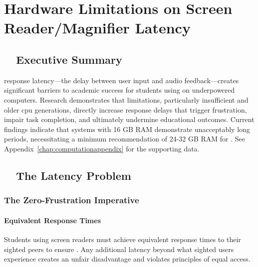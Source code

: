 \chapter{Hardware Limitations on Screen Reader/Magnifier Latency}\label{vision-assistive-technology-laptop-computer-requirements}
\raggedright
\section{~~Executive Summary}\label{executive-summary}

 response latency—the delay between user input and audio feedback—creates significant barriers to academic success for students using  on underpowered computers.\supercite{Foley2017AssistiveTechnologyOutcomes} Research demonstrates that  limitations, particularly insufficient  and older \gls{cpu} generations, directly increase response delays that trigger frustration, impair task completion, and ultimately undermine educational outcomes.\supercite{Kelly2011, StudentOutcomesResearch} Current findings indicate that systems with 16 GB RAM demonstrate unacceptably long  periods, necessitating a minimum recommendation of 24-32 GB RAM for . See Appendix~\ref{chap:computationappendix} for the supporting data.

\section{~~The Latency Problem}\label{the-latency-problem}

\subsection{The Zero-Frustration Imperative}\label{the-zero-frustration-imperative}

\subsubsection{Equivalent Response Times}

Students using screen readers must achieve equivalent response times to their sighted peers to ensure . Any additional latency beyond what sighted users experience creates an unfair disadvantage and violates principles of equal access.\supercite{ADA1990, Section508}

